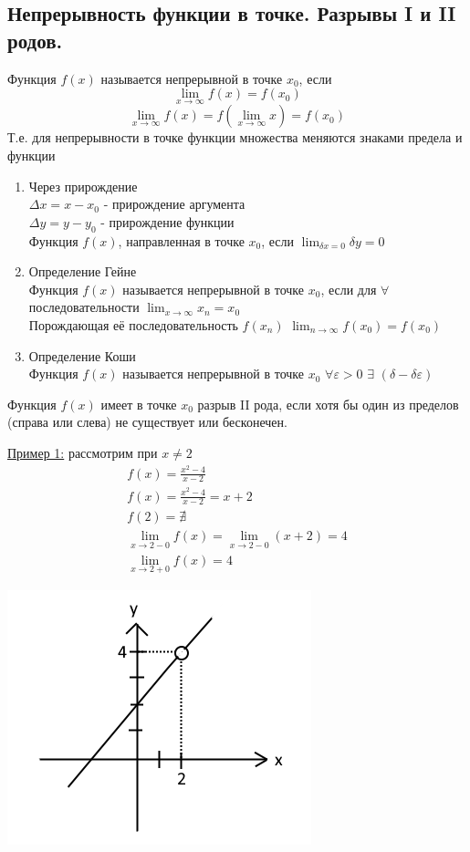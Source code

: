 \documentclass[12pt]{article}
\begin{document}
    \subsection{Непрерывность функции в точке. Разрывы I и II родов.}
    \noindent Функция $f(x)$ называется непрерывной в точке $x_0$, если 
    \[\lim_{x\to\infty}f(x) = f(x_0)\]
    \[\lim_{x\to\infty}f(x) = f(\lim_{x\to\infty}x) = f(x_0)\]
    \noindent Т.е. для непрерывности в точке функции множества меняются знаками предела и функции
    \begin{enumerate}
        \item Через прирождение\\
        $\varDelta x = x - x_0$ - прирождение аргумента\\
        $\varDelta y = y - y_0$ - прирождение функции\\
        Функция $f(x)$, направленная в точке $x_0$, если $\lim_{\delta x = 0} \delta y = 0$
        \item Определение Гейне\\
        Функция $f(x)$ называется непрерывной в точке $x_0$, если для $\forall$ последовательности $\lim_{x\to\infty} x_n = x_0$\\
        Порождающая её последовательность $f(x_n)$ $\lim_{n\to\infty} f(x_0) = f(x_0)$
        \item Определение Коши\\
        Функция $f(x)$ называется непрерывной в точке $x_0$ $\forall \varepsilon > 0$ $\exists$ $(\delta - \delta \varepsilon)$
    \end{enumerate}
    Функция $f(x)$ имеет в точке $x_0$ разрыв II рода, если хотя бы один из пределов (справа или слева) не существует или бесконечен.\par\noindent
    \underline{Пример 1:} рассмотрим при $x \ne 2$
    \begin{gather*}
        f(x) = \frac{x^2 - 4}{x-2}\\
        f(x) = \frac{x^2-4}{x-2} = x+2\\
        f(2) = \nexists\\
        \lim_{x\to 2-0} f(x) = \lim_{x\to 2-0}(x+2) = 4\\
        \lim_{x\to 2+0} f(x) = 4
    \end{gather*}
    \begin{center}
        \includegraphics{3.4.2}
    \end{center}
\end{document}

